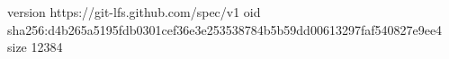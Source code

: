 version https://git-lfs.github.com/spec/v1
oid sha256:d4b265a5195fdb0301cef36e3e253538784b5b59dd00613297faf540827e9ee4
size 12384
